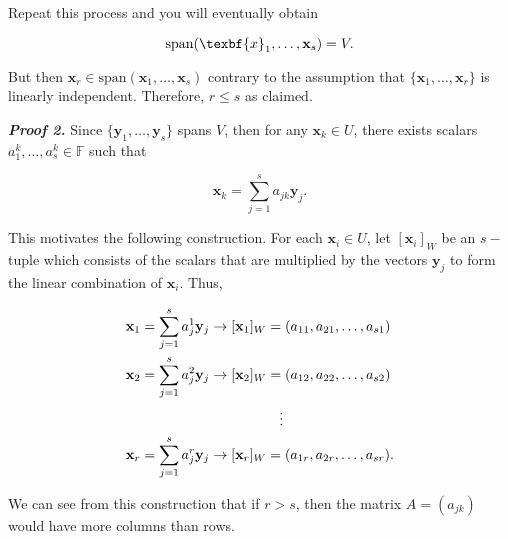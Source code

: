 \documentclass[12pt, a4paper]{article}
\begin{document}
 \noindent Repeat this process and you will eventually obtain
 
 \begin{equation}
     \text{span}(\texbf{x}_1,\dots,\textbf{x}_s)=V.
 \end{equation}
 
 \vspace{2mm}
 
 \noindent But then $\mathbf{x}_r\in\text{span}(\mathbf{x}_1,\dots,\mathbf{x}_s)$ contrary to the assumption that $\{\mathbf{x}_1,\dots,\mathbf{x}_r\}$ is linearly independent. Therefore, $r\leq s$ as claimed. \blacksquare
 
 \vspace{4mm}
 
 \newpage
 
 \textbf{\textit{Proof 2.}} Since $\{\mathbf{y}_1,\dots,\mathbf{y}_s\}$ spans $V$, then for any $\mathbf{x}_k\in U$, there exists scalars $a_1^k,\dots,a_s^k\in\mathbb{F}$ such that
 
 \begin{equation*}
     \mathbf{x}_k=\sum\limits_{j=1}^sa_{jk}\mathbf{y}_j.
 \end{equation*}
 
 \vspace{2mm}
 
 \noindent This motivates the following construction. For each $\mathbf{x}_i\in U$, let $[\mathbf{x}_i]_W$ be an $s-$tuple which consists of the scalars that are multiplied by the vectors $\mathbf{y}_j$ to form the linear combination of $\mathbf{x}_i$. Thus,
 
 \begin{equation*}
     \begin{split}
         \mathbf{x}_1 &=\sum\limits_{j=1}^sa_j^1\mathbf{y}_j\rightarrow [\mathbf{x}_1]_W=(a_{11}, a_{21},\dots, a_{s1}) \\
         \mathbf{x}_2 &=\sum\limits_{j=1}^sa_j^2\mathbf{y}_j\rightarrow [\mathbf{x}_2]_W=(a_{12},a_{22},\dots,a_{s2}) \\
         &\hspace{35mm}\vdots\\
         \mathbf{x}_r &=\sum\limits_{j=1}^sa_j^r\mathbf{y}_j\rightarrow[\mathbf{x}_r]_W=(a_{1r},a_{2r},\dots,a_{sr}).
     \end{split}
 \end{equation*}
 
 \vspace{2mm}
 
 \noindent We can see from this construction that if $r>s$, then the matrix $A=(a_{jk})$ would have more columns than rows.
 
\end{document}
